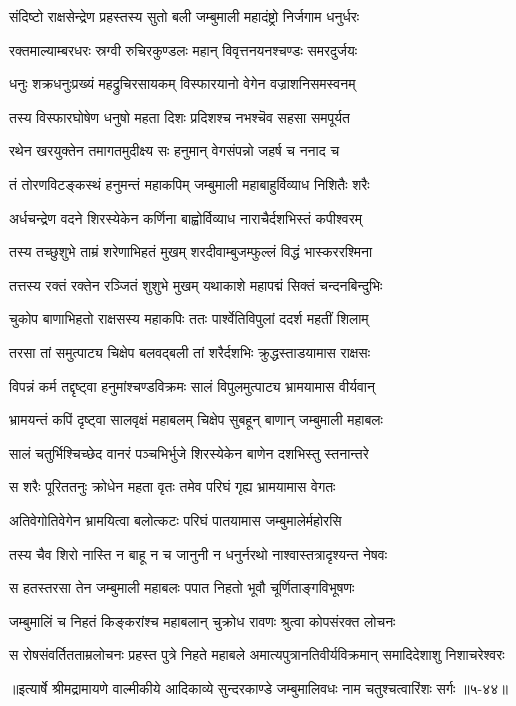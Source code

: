 
\twolineshloka
{संदिष्टो राक्षसेन्द्रेण प्रहस्तस्य सुतो बली}
{जम्बुमाली महादंष्ट्रो निर्जगाम धनुर्धरः} %

\twolineshloka
{रक्तमाल्याम्बरधरः स्रग्वी रुचिरकुण्डलः}
{महान् विवृत्तनयनश्चण्डः समरदुर्जयः} %

\twolineshloka
{धनुः शक्रधनुःप्रख्यं महद्रुचिरसायकम्}
{विस्फारयानो वेगेन वज्राशनिसमस्वनम्} %

\twolineshloka
{तस्य विस्फारघोषेण धनुषो महता दिशः}
{प्रदिशश्च नभश्चॆव सहसा समपूर्यत} %

\twolineshloka
{रथेन खरयुक्तेन तमागतमुदीक्ष्य सः}
{हनुमान् वेगसंपन्नो जहर्ष च ननाद च} %

\twolineshloka
{तं तोरणविटङ्कस्थं हनुमन्तं महाकपिम्}
{जम्बुमाली महाबाहुर्विव्याध निशितैः शरैः} %

\twolineshloka
{अर्धचन्द्रेण वदने शिरस्येकेन कर्णिना}
{बाह्वोर्विव्याध नाराचैर्दशभिस्तं कपीश्वरम्} %

\twolineshloka
{तस्य तच्छुशुभे ताम्रं शरेणाभिहतं मुखम्}
{शरदीवाम्बुजम्फुल्लं विद्धं भास्कररश्मिना} %

\twolineshloka
{तत्तस्य रक्तं रक्तेन रञ्जितं शुशुभे मुखम्}
{यथाकाशे महापद्मं सिक्तं चन्दनबिन्दुभिः} %

\twolineshloka
{चुकोप बाणाभिहतो राक्षसस्य महाकपिः}
{ततः पार्श्वेतिविपुलां ददर्श महतीं शिलाम्} %

\twolineshloka
{तरसा तां समुत्पाट्य चिक्षेप बलवद्बली}
{तां शरैर्दशभिः क्रुद्धस्ताडयामास राक्षसः} %

\twolineshloka
{विपन्नं कर्म तद्दृष्ट्वा हनुमांश्चण्डविक्रमः}
{सालं विपुलमुत्पाट्य भ्रामयामास वीर्यवान्} %

\twolineshloka
{भ्रामयन्तं कपिं दृष्ट्वा सालवृक्षं महाबलम्}
{चिक्षेप सुबहून् बाणान् जम्बुमाली महाबलः} %

\twolineshloka
{सालं चतुर्भिश्चिच्छेद वानरं पञ्चभिर्भुजे}
{शिरस्येकेन बाणेन दशभिस्तु स्तनान्तरे} %

\twolineshloka
{स शरैः पूरिततनुः क्रोधेन महता वृतः}
{तमेव परिघं गृह्य भ्रामयामास वेगतः} %

\twolineshloka
{अतिवेगोतिवेगेन भ्रामयित्वा बलोत्कटः}
{परिघं पातयामास जम्बुमालेर्महोरसि} %

\twolineshloka
{तस्य चैव शिरो नास्ति न बाहू न च जानुनी}
{न धनुर्नरथो नाश्वास्तत्रादृश्यन्त नेषवः} %

\twolineshloka
{स हतस्तरसा तेन जम्बुमाली महाबलः}
{पपात निहतो भूवौ चूर्णिताङ्गविभूषणः} %

\twolineshloka
{जम्बुमालिं च निहतं किङ्करांश्च महाबलान्}
{चुक्रोध रावणः श्रुत्वा कोपसंरक्त लोचनः} %

\twolineshloka
{स रोषसंवर्तितताम्रलोचनः प्रहस्त पुत्रे निहते महाबले}
{अमात्यपुत्रानतिवीर्यविक्रमान् समादिदेशाशु निशाचरेश्वरः} %


॥इत्यार्षे श्रीमद्रामायणे वाल्मीकीये आदिकाव्ये सुन्दरकाण्डे जम्बुमालिवधः नाम चतुश्चत्वारिंशः सर्गः ॥५-४४॥

